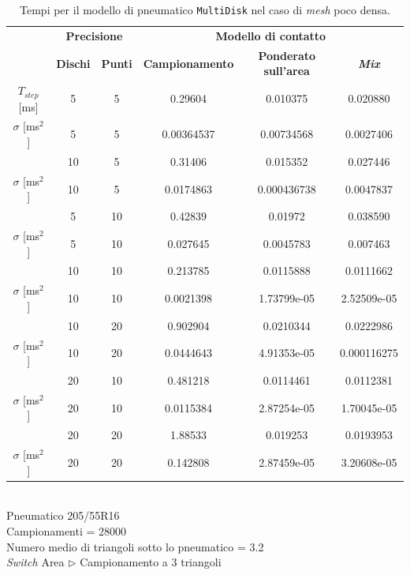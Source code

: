 \begin{table}
	\centering
	\begin{tabular}{c|c|c|c|c|c|}
		\cline{2-6} 
		& \multicolumn{2}{c|}{\textbf{Precisione}} &\multicolumn{3}{c|}{\textbf{Modello di contatto}} \\
		\cline{2-6} 
		& \textbf{Dischi} & \textbf{Punti} & \textbf{Campionamento} & \textbf{Ponderato sull'area} & \textbf{\textit{Mix}} \\ 
		\hline
		
		\multicolumn{1}{|c|}{$T_{step}$ [ms]} & 5 & 5 & 0.29604 & 0.010375 & 0.020880 \\ 
		\hline 
		\multicolumn{1}{|c|}{$\sigma$ [ms$^2$]} & 5 & 5 & 0.00364537 & 0.00734568 & 0.0027406 \\ 
		\hhline{======}
		
		\multicolumn{1}{|c|}{$T_{step}$ [ms]} & 10 & 5 & 0.31406 & 0.015352 & 0.027446 \\ 
		\hline 
		\multicolumn{1}{|c|}{$\sigma$ [ms$^2$]} & 10 & 5 & 0.0174863 & 0.000436738 & 0.0047837 \\ 
		\hhline{======}
		
		\multicolumn{1}{|c|}{$T_{step}$ [ms]} & 5 & 10 & 0.42839 & 0.01972 & 0.038590 \\ 
		\hline 
		\multicolumn{1}{|c|}{$\sigma$ [ms$^2$]} & 5 & 10 & 0.027645 & 0.0045783 & 0.007463 \\ 
		\hhline{======}
		
		\multicolumn{1}{|c|}{$T_{step}$ [ms]} & 10 & 10 & 0.213785 & 0.0115888 & 0.0111662 \\ 
		\hline 
		\multicolumn{1}{|c|}{$\sigma$ [ms$^2$]} & 10 & 10 & 0.0021398 & 1.73799e-05 & 2.52509e-05 \\
		\hhline{======}

		\multicolumn{1}{|c|}{$T_{step}$ [ms]} & 10 & 20 & 0.902904 & 0.0210344 & 0.0222986 \\ 
		\hline 
		\multicolumn{1}{|c|}{$\sigma$ [ms$^2$]} & 10 & 20 & 0.0444643 & 4.91353e-05 & 0.000116275 \\ 
		\hhline{======}
		
		\multicolumn{1}{|c|}{$T_{step}$ [ms]} & 20 & 10 & 0.481218 & 0.0114461 & 0.0112381 \\ 
		\hline 
		\multicolumn{1}{|c|}{$\sigma$ [ms$^2$]} & 20 & 10 & 0.0115384 & 2.87254e-05 & 1.70045e-05 \\ 
		\hhline{======}
		
		\multicolumn{1}{|c|}{$T_{step}$ [ms]} & 20 & 20 & 1.88533 & 0.019253 & 0.0193953 \\ 
		\hline 
		\multicolumn{1}{|c|}{$\sigma$ [ms$^2$]} & 20 & 20 & 0.142808 & 2.87459e-05 & 3.20608e-05 \\ 
		\hline
	\end{tabular}
	\\[0.5cm]
	Pneumatico 205/55R16\\
	Campionamenti = 28000\\
	Numero medio di triangoli sotto lo pneumatico = 3.2\\
	\textit{Switch} Area $\triangleright$ Campionamento a 3 triangoli
	\caption{Tempi per il modello di pneumatico \texttt{MultiDisk} nel caso di \textit{mesh} poco densa.}
	\label{MDpiano}
\end{table}
